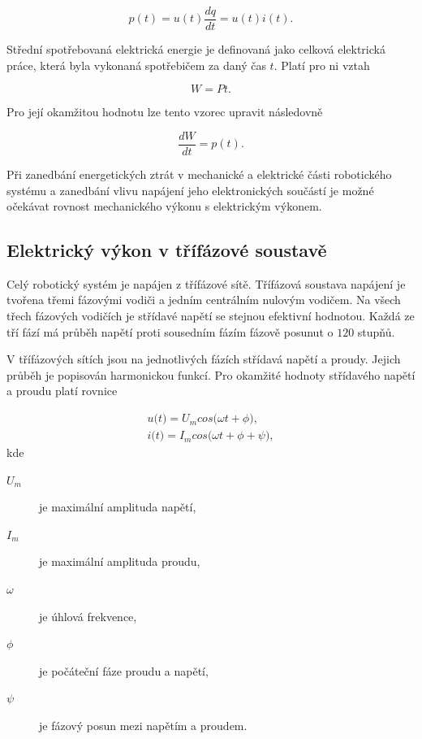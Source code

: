 \begin{equation}
p(t) = u(t)\frac{dq}{dt} = u(t)i(t).
\end{equation}

Střední spotřebovaná elektrická energie je definovaná jako celková elektrická práce, která byla vykonaná spotřebičem za daný čas $t$. Platí pro ni vztah

\begin{equation}
W = Pt.
\end{equation}

Pro její okamžitou hodnotu lze tento vzorec upravit následovně

\begin{equation}
\frac{dW}{dt} = p(t).
\end{equation}  

Při zanedbání energetických ztrát v mechanické a elektrické části robotického systému a zanedbání vlivu napájení jeho elektronických součástí je možné očekávat rovnost mechanického výkonu s elektrickým výkonem.

\subsection{Elektrický výkon v třífázové soustavě}

Celý robotický systém je napájen z třífázové sítě. Třífázová soustava napájení je tvořena třemi fázovými vodiči a jedním centrálním nulovým vodičem. Na všech třech fázových vodičích je střídavé napětí se stejnou efektivní hodnotou. Každá ze tří fází má průběh napětí proti sousedním fázím fázově posunut o $120$ stupňů. 

V třífázových sítích jsou na jednotlivých fázích střídavá napětí a proudy. Jejich průběh je popisován harmonickou funkcí. Pro okamžité hodnoty střídavého napětí a proudu platí rovnice

\begin{equation}
\begin{split}
u\big(t\big) = U_m cos\big(\omega t + \phi\big), \\
i\big(t\big) = I_m cos\big(\omega t + \phi + \psi\big),
\end{split}
\label{harm_curr_volt_eq}
\end{equation}  
kde
\begin{description}
\item[$U_m$] je maximální amplituda napětí,
\item[$I_m$] je maximální amplituda proudu,
\item[$\omega$] je úhlová frekvence,
\item[$\phi$] je počáteční fáze proudu a napětí,
\item[$\psi$] je fázový posun mezi napětím a proudem.
\end{description}


